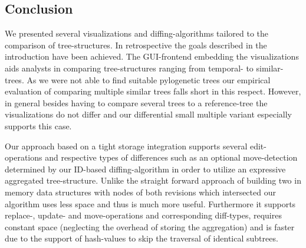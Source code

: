 
\subsection{Conclusion}
We presented several visualizations and diffing-algorithms tailored to the comparison of tree-structures. In retrospective the goals described in the introduction have been achieved. The GUI-frontend embedding the visualizations aids analysts in comparing tree-structures ranging from temporal- to similar-trees. As we were not able to find suitable pylogenetic trees our empirical evaluation of comparing multiple similar trees falls short in this respect. However, in general besides having to compare several trees to a reference-tree the visualizations do not differ and our differential small multiple variant especially supports this case.

Our approach based on a tight storage integration supports several edit-operations and respective types of differences such as an optional move-detection determined by our ID-based diffing-algorithm in order to utilize an expressive aggregated tree-structure. Unlike the straight forward approach of building two in memory data structures with nodes of both revisions which intersected our algorithm uses less space and thus is much more useful. Furthermore it supports replace-, update- and move-operations and corresponding diff-types, requires constant space (neglecting the overhead of storing the aggregation) and is faster due to the support of hash-values to skip the traversal of identical subtrees. 

